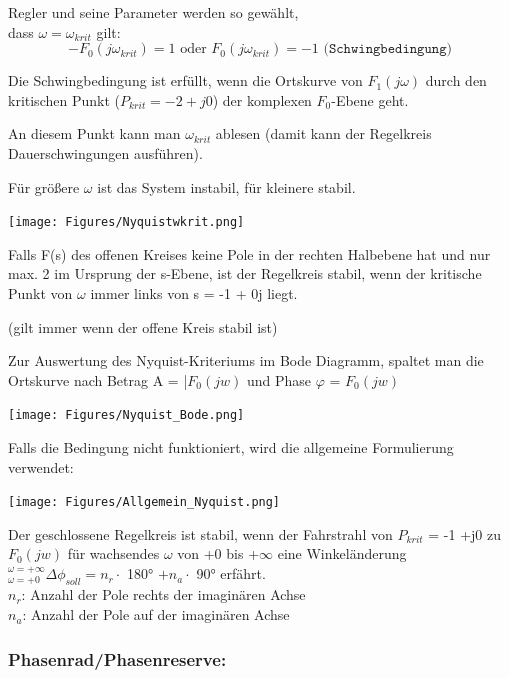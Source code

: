 Regler und seine Parameter werden so gewählt,\\ dass $\omega = \omega_{krit}$ gilt:
\[
	-F_0 (j\omega_{krit})=1 \text{ oder } F_0 (j\omega_{krit})=-1 \texttt{ (Schwingbedingung)}
\]

\begin{mdframed}[style=exercise]
	Die Schwingbedingung ist erfüllt, wenn die Ortskurve von $F_1 (j\omega)$
	durch den kritischen Punkt ($P_{krit} = -2+j0$) der komplexen $F_0$-Ebene
	geht.

	An diesem Punkt kann man $\omega_{krit}$ ablesen (damit kann der Regelkreis
	Dauerschwingungen ausführen).

	Für größere $\omega$ ist das System instabil, für kleinere stabil.
\end{mdframed}

\texttt{[image: Figures/Nyquistwkrit.png]}

\begin{mdframed}[style=exercise]
	Falls F(s) des offenen Kreises keine Pole in der rechten Halbebene hat und
	nur max. 2 im Ursprung der s-Ebene, ist der Regelkreis stabil, wenn der
	kritische Punkt von $\omega$ immer links von s = -1 + 0j liegt.

	\footnotesize
	(gilt immer wenn der offene Kreis stabil ist)
\end{mdframed}

Zur Auswertung des Nyquist-Kriteriums im Bode Diagramm, spaltet man die Ortskurve nach Betrag
A = |$F_0 (jw)$ und Phase $\varphi$ = $F_0(jw)$

\texttt{[image: Figures/Nyquist\_Bode.png]}

Falls die Bedingung nicht funktioniert, wird die allgemeine Formulierung verwendet:

\texttt{[image: Figures/Allgemein\_Nyquist.png]}

\begin{mdframed}[style=exercise]
	Der geschlossene Regelkreis ist stabil, wenn der Fahrstrahl von $P_{krit}$ = -1 +j0
	zu $F_0 (jw)$ für wachsendes $\omega$ von +0 bis +$\infty$ eine Winkeländerung
	$^{\omega=+\infty}_{\omega=+0} \Delta \phi _{soll} = n_r \cdot$ 180° $+n_a \cdot$ 90°
	erfährt.\\
	$n_r$: Anzahl der Pole rechts der imaginären Achse\\
	$n_a$: Anzahl der Pole auf der imaginären Achse
\end{mdframed}

\subsubsection{Phasenrad/Phasenreserve:}

